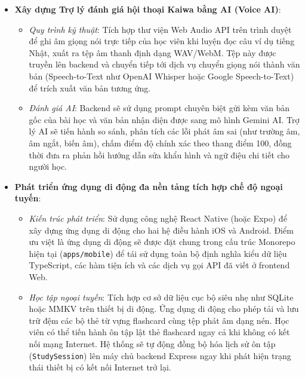\documentclass[../DoAn.tex]{subfiles}
\begin{document}
\begin{itemize}
    \item \textbf{Xây dựng Trợ lý đánh giá hội thoại Kaiwa bằng AI (Voice AI)}:
    \begin{itemize}
        \item \textit{Quy trình kỹ thuật}: Tích hợp thư viện Web Audio API trên trình duyệt để ghi âm giọng nói trực tiếp của học viên khi luyện đọc câu ví dụ tiếng Nhật, xuất ra tệp âm thanh định dạng WAV/WebM. Tệp này được truyền lên backend và chuyển tiếp tới dịch vụ chuyển giọng nói thành văn bản (Speech-to-Text như OpenAI Whisper hoặc Google Speech-to-Text) để trích xuất văn bản tương ứng.
        \item \textit{Đánh giá AI}: Backend sẽ sử dụng prompt chuyên biệt gửi kèm văn bản gốc của bài học và văn bản nhận diện được sang mô hình Gemini AI. Trợ lý AI sẽ tiến hành so sánh, phân tích các lỗi phát âm sai (như trường âm, âm ngắt, biến âm), chấm điểm độ chính xác theo thang điểm 100, đồng thời đưa ra phản hồi hướng dẫn sửa khẩu hình và ngữ điệu chi tiết cho người học.
    \end{itemize}
    
    \item \textbf{Phát triển ứng dụng di động đa nền tảng tích hợp chế độ ngoại tuyến}:
    \begin{itemize}
        \item \textit{Kiến trúc phát triển}: Sử dụng công nghệ React Native (hoặc Expo) để xây dựng ứng dụng di động cho hai hệ điều hành iOS và Android. Điểm ưu việt là ứng dụng di động sẽ được đặt chung trong cấu trúc Monorepo hiện tại (\texttt{apps/mobile}) để tái sử dụng toàn bộ định nghĩa kiểu dữ liệu TypeScript, các hàm tiện ích và các dịch vụ gọi API đã viết ở frontend Web.
        \item \textit{Học tập ngoại tuyến}: Tích hợp cơ sở dữ liệu cục bộ siêu nhẹ như SQLite hoặc MMKV trên thiết bị di động. Ứng dụng di động cho phép tải và lưu trữ đệm các bộ thẻ từ vựng flashcard cùng tệp phát âm dạng nén. Học viên có thể tiến hành ôn tập lật thẻ flashcard ngay cả khi không có kết nối mạng Internet. Hệ thống sẽ tự động đồng bộ hóa lịch sử ôn tập (\texttt{StudySession}) lên máy chủ backend Express ngay khi phát hiện trạng thái thiết bị có kết nối Internet trở lại.
    \end{itemize}
\end{itemize}
\end{document}
